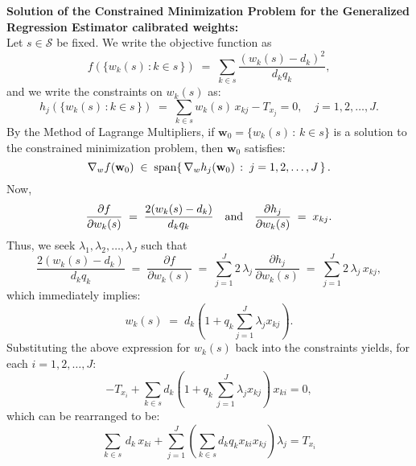 \documentclass{article}
\begin{document}
\vskip 0.5cm
\noindent
\textbf{Solution of the Constrained Minimization Problem for the Generalized Regression Estimator calibrated weights:}\\
Let $s \in \mathcal{S}$ be fixed. We write the objective function as
\begin{equation*}
f(\{w_{k}(s)\,:k\in s\,\}) \; = \; \sum_{k \in s} \dfrac{(w_{k}(s) - d_{k})^{2}}{d_{k}q_{k}},
\end{equation*}
and we write the constraints on $w_{k}(s)$ as:
\begin{equation*}
h_{j}(\{w_{k}(s)\,:k\in s\,\}) \; = \; \sum_{k \in s} w_{k}(s)\,x_{kj} - T_{x_{j}} = 0,
\quad j = 1, 2, \ldots, J.
\end{equation*}
By the Method of Lagrange Multipliers, if $\mathbf{w}_{0} = \{w_{k}(s)\,:\,k \in s\}$ is a
solution to the constrained minimization problem, then $\mathbf{w}_{0}$ satisfies:
\begin{equation*}
\nabla_{w}f(\mathbf{w}_{0}) \;\in\; \textnormal{span}\!\left\{\,\nabla_{w}h_{j}(\mathbf{w}_{0})\,:\;j = 1,2,\ldots, J\,\right\}.
\end{equation*}
Now,
\begin{equation*}
\dfrac{\partial f}{\partial w_{k}(s)} \; = \; \dfrac{2(w_{k}(s) - d_{k})}{d_{k}q_{k}}
\quad\textnormal{and}\quad
\dfrac{\partial h_{j}}{\partial w_{k}(s)} \; = \; x_{kj}.
\end{equation*}
Thus, we seek $\lambda_{1},\lambda_{2},\ldots,\lambda_{J}$ such that
\begin{equation*}
\dfrac{2(w_{k}(s) - d_{k})}{d_{k}q_{k}}
\;=\; \dfrac{\partial f}{\partial w_{k}(s)}
\;=\; \sum_{j = 1}^{J} 2\,\lambda_{j}\,\dfrac{\partial h_{j}}{\partial w_{k}(s)}
\;=\; \sum_{j = 1}^{J} 2\,\lambda_{j}\,x_{kj},
\end{equation*}
which immediately implies:
\begin{equation*}
w_{k}(s) \;=\; d_{k}\left(1 + q_{k}\sum_{j=1}^{J}\lambda_{j}x_{kj}\right).
\end{equation*}
Substituting the above expression for $w_{k}(s)$ back into the constraints yields,
for each $i = 1, 2, \ldots, J$:
\begin{equation*}
-T_{x_{i}} + \sum_{k \in s} d_{k}\left(1 + q_{k}\,\sum_{j=1}^{J}\lambda_{j}x_{kj}\right)\,x_{ki} = 0,
\end{equation*}
which can be rearranged to be:
\begin{equation*}
\sum_{k \in s}\,d_{k}\,x_{ki} + \sum_{j=1}^{J}\left(\sum_{k \in s}d_{k}q_{k}x_{ki}x_{kj}\right)\lambda_{j} = T_{x_{i}}
\end{equation*}
\end{document}
